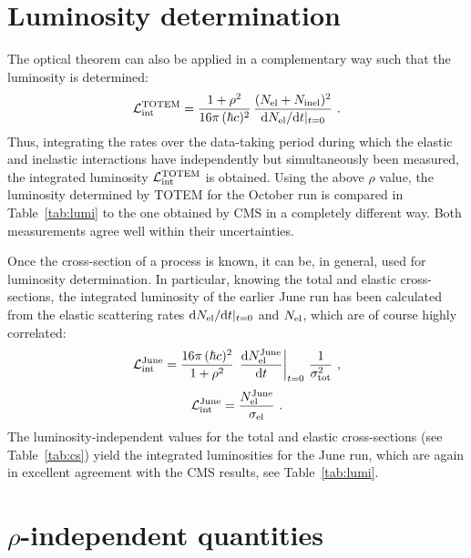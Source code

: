 \documentclass[doublecol]{epl/epl2}
\def\d{{\rm d}}
\begin{document}
\TabCS
\TabLumi
\FigSigmas

\section{Luminosity determination}

The optical theorem can also be applied in a complementary way such that the luminosity is determined:
\begin{equation}
\label{eq:lumi oct}
{\cal L_{\rm int}^{\rm TOTEM}} = {1 + \rho^2 \over 16\pi\, (\hbar c)^2}\, { (N_{\rm el} + N_{\rm inel})^2 \over \d N_{\rm el}/\d t|_{t=0} }\ .
\end{equation}
Thus, integrating the rates over the data-taking period during which the elastic \cite{P1} and inelastic \cite{P2} interactions have independently but simultaneously been measured, the integrated luminosity ${\cal L}_{\rm int}^{\rm TOTEM}$ is obtained. Using the above $\rho$ value, the luminosity determined by TOTEM for the October run is compared in Table~\ref{tab:lumi} to the one obtained by CMS in a completely different way. Both measurements agree well within their uncertainties.


Once the cross-section of a process is known, it can be, in general, used for luminosity determination. In particular, knowing the total and elastic cross-sections, the integrated luminosity of the earlier June run \cite{epl96} has been calculated from the elastic scattering rates $\d N_{\rm el}/\d t|_{t=0}$ and $N_{\rm el}$, which are of course highly correlated:
\begin{equation}
\label{eq:lumi jun tot}
{\cal L}_{\rm int}^{\rm June} =  {16\pi\, (\hbar c)^2\over 1 + \rho^2}\, \left. \d N_{\rm el}^{\rm June}\over\d t\right|_{t=0}\, {1\over \sigma_{\rm tot}^2}\ ,
\end{equation}
\begin{equation}
\label{eq:lumi jun el}
{\cal L}_{\rm int}^{\rm June} = {N_{\rm el}^{\rm June}\over \sigma_{\rm el}}\ .
\end{equation}
The luminosity-independent values for the total and elastic cross-sections (see Table~\ref{tab:cs}) yield the integrated luminosities for the June run, which are again in excellent agreement with the CMS results, see Table~\ref{tab:lumi}.

\section{$\rho$-independent quantities}
\end{document}

